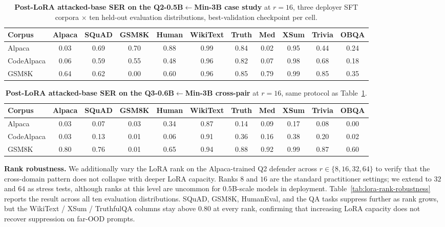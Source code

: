 \documentclass{article}
\theoremstyle{plain}
\theoremstyle{definition}
\theoremstyle{remark}
\begin{document}
\begin{table}[!htbp]
\centering
\small
\setlength{\tabcolsep}{4pt}
\caption{\textbf{Post-LoRA attacked-base SER on the Q2-0.5B$\leftarrow$Min-3B case study} at $r{=}16$, three deployer SFT corpora $\times$ ten held-out evaluation distributions, best-validation checkpoint per cell.}
\label{tab:lora-cross-domain}
\begin{tabular}{lcccccccccc}
\toprule
Corpus & Alpaca & SQuAD & GSM8K & Human & WikiText & Truth & Med & XSum & Trivia & OBQA \\
\midrule
Alpaca       & 0.03 & 0.69 & 0.70 & 0.88 & 0.99 & 0.84 & 0.02 & 0.95 & 0.44 & 0.24 \\
CodeAlpaca   & 0.06 & 0.59 & 0.55 & 0.48 & 0.96 & 0.82 & 0.07 & 0.98 & 0.68 & 0.18 \\
GSM8K        & 0.64 & 0.62 & 0.00 & 0.60 & 0.96 & 0.85 & 0.79 & 0.99 & 0.85 & 0.35 \\
\bottomrule
\end{tabular}
\end{table}

\begin{table}[!htbp]
\centering
\small
\setlength{\tabcolsep}{4pt}
\caption{\textbf{Post-LoRA attacked-base SER on the Q3-0.6B$\leftarrow$Min-3B cross-pair} at $r{=}16$, same protocol as Table~\ref{tab:lora-cross-domain}.}
\label{tab:lora-cross-domain-q3}
\begin{tabular}{lcccccccccc}
\toprule
Corpus & Alpaca & SQuAD & GSM8K & Human & WikiText & Truth & Med & XSum & Trivia & OBQA \\
\midrule
Alpaca       & 0.03 & 0.07 & 0.03 & 0.34 & 0.87 & 0.14 & 0.09 & 0.17 & 0.08 & 0.00 \\
CodeAlpaca   & 0.03 & 0.13 & 0.01 & 0.06 & 0.91 & 0.36 & 0.16 & 0.38 & 0.20 & 0.02 \\
GSM8K        & 0.80 & 0.76 & 0.01 & 0.65 & 0.94 & 0.88 & 0.92 & 0.99 & 0.87 & 0.60 \\
\bottomrule
\end{tabular}
\end{table}

\noindent\textbf{Rank robustness.}
We additionally vary the LoRA rank on the Alpaca-trained Q2 defender across $r\in\{8,16,32,64\}$ to verify that the cross-domain pattern does not collapse with deeper LoRA capacity. Ranks $8$ and $16$ are the standard practitioner settings; we extend to $32$ and $64$ as stress tests, although ranks at this level are uncommon for $0.5$B-scale models in deployment. Table~\ref{tab:lora-rank-robustness} reports the result across all ten evaluation distributions. SQuAD, GSM8K, HumanEval, and the QA tasks suppress further as rank grows, but the WikiText / XSum / TruthfulQA columns stay above $0.80$ at every rank, confirming that increasing LoRA capacity does not recover suppression on far-OOD prompts.
\end{document}
